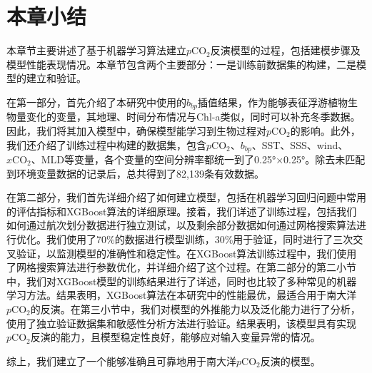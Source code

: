 
\section{本章小结}

本章节主要讲述了基于机器学习算法建立$p\mathrm{CO_2}$反演模型的过程，包括建模步骤及模型性能表现情况。本章节包含两个主要部分：一是训练前数据集的构建，二是模型的建立和验证。

在第一部分，首先介绍了本研究中使用的$b_{bp}$插值结果，作为能够表征浮游植物生物量变化的变量，其地理、时间分布情况与Chl-a类似，同时可以补充冬季数据。因此，我们将其加入模型中，确保模型能学习到生物过程对$p\mathrm{CO_2}$的影响。此外，我们还介绍了训练过程中构建的数据集，包含$p\mathrm{CO_2}$、$b_{bp}$、SST、SSS、wind、$x\mathrm{CO_2}$、MLD等变量，各个变量的空间分辨率都统一到了0.25°×0.25°。除去未匹配到环境变量数据的记录后，总共得到了82,139条有效数据。

在第二部分，我们首先详细介绍了如何建立模型，包括在机器学习回归问题中常用的评估指标和XGBoost算法的详细原理。接着，我们详述了训练过程，包括我们如何通过航次划分数据进行独立测试，以及剩余部分数据如何通过网格搜索算法进行优化。我们使用了70\%的数据进行模型训练，30\%用于验证，同时进行了三次交叉验证，以监测模型的准确性和稳定性。在XGBoost算法训练过程中，我们使用了网格搜索算法进行参数优化，并详细介绍了这个过程。在第二部分的第二小节中，我们对XGBoost模型的训练结果进行了详述，同时也比较了多种常见的机器学习方法。结果表明，XGBoost算法在本研究中的性能最优，最适合用于南大洋$p\mathrm{CO_2}$的反演。在第三小节中，我们对模型的外推能力以及泛化能力进行了分析，使用了独立验证数据集和敏感性分析方法进行验证。结果表明，该模型具有实现$p\mathrm{CO_2}$反演的能力，且模型稳定性良好，能够应对输入变量异常的情况。

综上，我们建立了一个能够准确且可靠地用于南大洋$p\mathrm{CO_2}$反演的模型。





























